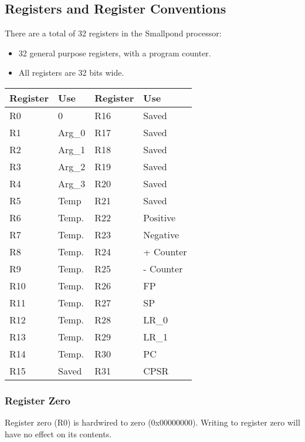 \documentclass[12pt]{article}
\begin{document}
   \subsection{Registers and Register Conventions}
   
   There are a total of 32 registers in the Smallpond processor:
   \begin{itemize}
       \item 32 general purpose registers, with a program counter.
       \item  All registers are 32 bits wide.
   \end{itemize}
   
   \begin{center}
   \begin{tabular}{|p{1.6cm}|p{2cm}||p{1.6cm}|p{2cm}|}
        \hline
        \textbf{Register} & \textbf{Use} & \textbf{Register} & \textbf{Use}\\
        \hline
        R0 & 0 & R16 & Saved\\
        \hline
        R1 & Arg\_0 & R17 &Saved\\
        \hline
        R2 & Arg\_1 & R18 &Saved\\
        \hline
        R3 & Arg\_2 & R19 &Saved\\
        \hline
        R4 & Arg\_3 & R20 &Saved\\
        \hline
        R5 & Temp & R21 &Saved\\
        \hline
        R6 & Temp. & R22 &Positive\\
        \hline
        R7 & Temp. & R23 &Negative\\
        \hline
        R8 & Temp. & R24 &+ Counter\\
        \hline
        R9 & Temp. & R25 &- Counter\\
        \hline
        R10 & Temp. & R26 &FP\\
        \hline
        R11 & Temp. & R27 &SP\\
        \hline
        R12 & Temp. & R28 &LR\_0\\
        \hline
        R13 & Temp. & R29 &LR\_1\\
        \hline
        R14 & Temp. & R30 & PC\\
        \hline
        R15 & Saved & R31 & CPSR\\
        \hline
   \end{tabular}
   \end{center}
    
    \subsubsection{Register Zero}
        Register zero (R0) is hardwired to zero (0x00000000). Writing to register zero will have no effect on its contents.
        
\end{document}
